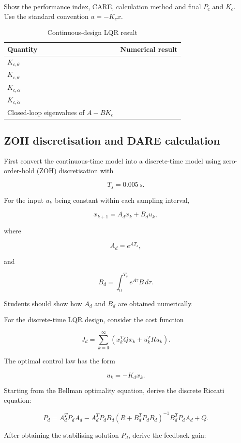 \documentclass[11pt,a4paper]{article}
\newcommand{\studenttext}[1]{\begin{studentbox}\vspace{#1}\end{studentbox}}
\begin{document}
Show the performance index, CARE, calculation method and final $P_c$ and $K_c$.
Use the standard convention $u=-K_cx$.

\studenttext{48mm}

\begin{table}[H]
\centering
\caption{Continuous-design LQR result}
\label{tab:kc}
\begin{tabular}{lc}
\toprule
Quantity & Numerical result\\
\midrule
$K_{c,\theta}$ & \\
$K_{c,\dot\theta}$ & \\
$K_{c,\alpha}$ & \\
$K_{c,\dot\alpha}$ & \\
Closed-loop eigenvalues of $A-BK_c$ & \\
\bottomrule
\end{tabular}
\end{table}

\subsection{ZOH discretisation and DARE calculation}

First convert the continuous-time model into a discrete-time model using
zero-order-hold (ZOH) discretisation with

\[
T_s=0.005~\mathrm{s}.
\]

For the input $u_k$ being constant within each sampling interval,

\[
x_{k+1}=A_dx_k+B_du_k ,
\]

where

\[
A_d=e^{AT_s},
\]

and

\[
B_d=\int_0^{T_s}e^{A\tau}B\,d\tau .
\]

Students should show how $A_d$ and $B_d$ are obtained numerically.

For the discrete-time LQR design, consider the cost function

\[
J_d=
\sum_{k=0}^{\infty}
(x_k^TQx_k+u_k^TRu_k).
\]

The optimal control law has the form

\[
u_k=-K_dx_k .
\]

Starting from the Bellman optimality equation, derive the discrete Riccati
equation:

\[
P_d=
A_d^TP_dA_d
-
A_d^TP_dB_d
(R+B_d^TP_dB_d)^{-1}
B_d^TP_dA_d
+Q .
\]

After obtaining the stabilising solution $P_d$, derive the feedback gain:
\end{document}

